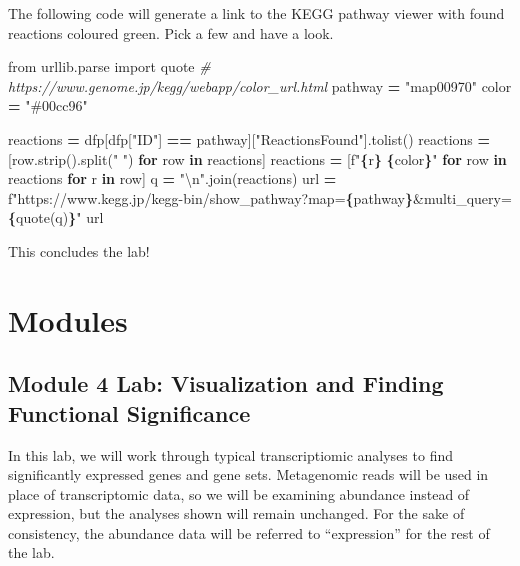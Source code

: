 \documentclass[
]{book}
\newenvironment{Shaded}{\begin{snugshade}}{\end{snugshade}}
\newcommand{\CharTok}[1]{\textcolor[rgb]{0.31,0.60,0.02}{#1}}
\newcommand{\CommentTok}[1]{\textcolor[rgb]{0.56,0.35,0.01}{\textit{#1}}}
\newcommand{\ControlFlowTok}[1]{\textcolor[rgb]{0.13,0.29,0.53}{\textbf{#1}}}
\newcommand{\ImportTok}[1]{#1}
\newcommand{\KeywordTok}[1]{\textcolor[rgb]{0.13,0.29,0.53}{\textbf{#1}}}
\newcommand{\NormalTok}[1]{#1}
\newcommand{\OperatorTok}[1]{\textcolor[rgb]{0.81,0.36,0.00}{\textbf{#1}}}
\newcommand{\SpecialCharTok}[1]{\textcolor[rgb]{0.81,0.36,0.00}{\textbf{#1}}}
\newcommand{\SpecialStringTok}[1]{\textcolor[rgb]{0.31,0.60,0.02}{#1}}
\newcommand{\StringTok}[1]{\textcolor[rgb]{0.31,0.60,0.02}{#1}}
\begin{document}
The following code will generate a link to the KEGG pathway viewer with found reactions coloured green.
Pick a few and have a look.

\begin{Shaded}
\begin{Highlighting}[numbers=left,,]
\ImportTok{from}\NormalTok{ urllib.parse }\ImportTok{import}\NormalTok{ quote}
\CommentTok{\# https://www.genome.jp/kegg/webapp/color\_url.html}
\NormalTok{pathway }\OperatorTok{=} \StringTok{"map00970"}
\NormalTok{color }\OperatorTok{=} \StringTok{"\#00cc96"}

\NormalTok{reactions }\OperatorTok{=}\NormalTok{ dfp[dfp[}\StringTok{"ID"}\NormalTok{] }\OperatorTok{==}\NormalTok{ pathway][}\StringTok{"ReactionsFound"}\NormalTok{].tolist()}
\NormalTok{reactions }\OperatorTok{=}\NormalTok{ [row.strip().split(}\StringTok{" "}\NormalTok{) }\ControlFlowTok{for}\NormalTok{ row }\KeywordTok{in}\NormalTok{ reactions]}
\NormalTok{reactions }\OperatorTok{=}\NormalTok{ [}\SpecialStringTok{f"}\SpecialCharTok{\{}\NormalTok{r}\SpecialCharTok{\}}\SpecialStringTok{ }\SpecialCharTok{\{}\NormalTok{color}\SpecialCharTok{\}}\SpecialStringTok{"} \ControlFlowTok{for}\NormalTok{ row }\KeywordTok{in}\NormalTok{ reactions }\ControlFlowTok{for}\NormalTok{ r }\KeywordTok{in}\NormalTok{ row]}
\NormalTok{q }\OperatorTok{=} \StringTok{"}\CharTok{\textbackslash{}n}\StringTok{"}\NormalTok{.join(reactions)}
\NormalTok{url }\OperatorTok{=} \SpecialStringTok{f"https://www.kegg.jp/kegg{-}bin/show\_pathway?map=}\SpecialCharTok{\{}\NormalTok{pathway}\SpecialCharTok{\}}\SpecialStringTok{\&multi\_query=}\SpecialCharTok{\{}\NormalTok{quote(q)}\SpecialCharTok{\}}\SpecialStringTok{"}
\NormalTok{url}
\end{Highlighting}
\end{Shaded}

This concludes the lab!

\part{Modules}\label{part-modules-3}

\chapter{Module 4 Lab: Visualization and Finding Functional Significance}\label{module-4-lab-visualization-and-finding-functional-significance}

In this lab, we will work through typical transcriptiomic analyses to find significantly expressed genes
and gene sets. Metagenomic reads will be used in place of transcriptomic data, so we will be examining
abundance instead of expression, but the analyses shown will remain unchanged.
For the sake of consistency, the abundance data will be referred to ``expression'' for the rest of the lab.
\end{document}

